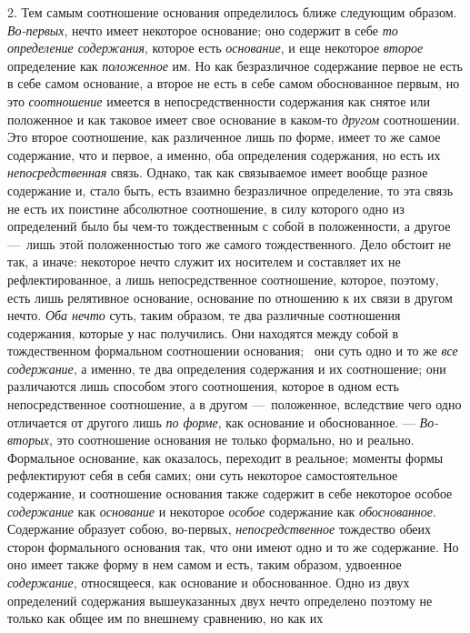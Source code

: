 2. Тем самым соотношение основания определилось ближе следующим образом.
{\em Во-первых}, нечто имеет некоторое основание; оно
содержит в себе {\em то определение содержания},
которое есть {\em основание}, и еще некоторое
{\em второе} определение как
{\em положенное} им. Но как безразличное содержание
первое не есть в себе самом основание, а второе не есть в себе самом
обоснованное первым, но это {\em соотношение} имеется в
непосредственности содержания как снятое или положенное и как таковое имеет
свое основание в каком-то {\em другом} соотношении. Это
второе соотношение, как различенное лишь по форме, имеет то же самое
содержание, что и первое, а именно, оба определения содержания, но есть их
{\em непосредственная} связь. Однако, так как
связываемое имеет вообще разное содержание и, стало быть, есть взаимно
безразличное определение, то эта связь не есть их поистине абсолютное
соотношение, в силу которого одно из определений было бы чем-то
тождественным с собой в положенности, а другое —~лишь этой положенностью
того же самого тождественного. Дело обстоит не так, а иначе: некоторое
нечто служит их носителем и составляет их не рефлектированное, а лишь
непосредственное соотношение, которое, поэтому, есть лишь релятивное
основание, основание по отношению к их связи в другом нечто.
{\em Оба нечто} суть, таким образом, те два различные
соотношения содержания, которые у нас получились. Они находятся между собой
в тождественном формальном соотношении основания; \ они суть одно и то же
{\em все содержание}, а именно, те два определения
содержания и их соотношение; они различаются лишь способом этого
соотношения, которое в одном есть непосредственное соотношение, а в другом
—~положенное, вследствие чего одно отличается от другого лишь
{\em по форме}, как основание и обоснованное. —
{\em Во-вторых}, это соотношение основания не только
формально, но и реально. Формальное основание, как оказалось, переходит в
реальное; моменты формы рефлектируют себя в себя самих; они суть некоторое
самостоятельное содержание, и соотношение основания также содержит в себе
некоторое особое {\em содержание} как
{\em основание} и некоторое
{\em особое} содержание как
{\em обоснованное}. Содержание образует собою,
во-первых, {\em непосредственное} тождество обеих
сторон формального основания так, что они имеют одно и то же содержание. Но
оно имеет также форму в нем самом и есть, таким образом, удвоенное
{\em содержание}, относящееся, как основание и
обоснованное. Одно из двух определений содержания вышеуказанных двух нечто
определено поэтому не только как общее им по внешнему сравнению, но как их
